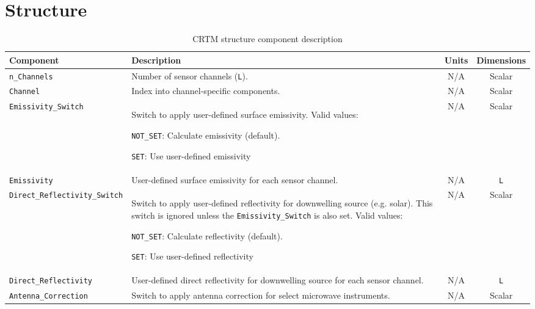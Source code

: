 \clearpage
\section{\Options{} Structure}
\label{sec:options_structure}



\begin{table}[htp]
  \centering
  \begin{tabular}{l p{7cm} c c}
    \hline
    \sffamily\textbf{Component} & \sffamily\textbf{Description} & \sffamily\textbf{Units} & \sffamily\textbf{Dimensions} \\
    \hline\hline
    \texttt{n\_Channels}                  & Number of sensor channels (\texttt{L}). & N/A & Scalar \\
    \texttt{Channel}                      & Index into channel-specific components. & N/A & Scalar \\
    \texttt{Emissivity\_Switch}           & Switch to apply user-defined surface emissivity. Valid values:

    \parbox{7cm}{\hspace{0.5cm}\texttt{NOT\_SET}: Calculate emissivity (default).
    
                 \hspace{0.5cm}\texttt{SET}: Use user-defined emissivity}
     & N/A & Scalar \\
    \texttt{Emissivity}                   & User-defined surface emissivity for each sensor channel. & N/A & \texttt{L} \\
    \texttt{Direct\_Reflectivity\_Switch} & Switch to apply user-defined reflectivity for downwelling source (e.g. solar). This switch is ignored unless the \texttt{Emissivity\_Switch} is also set. Valid values:

    \parbox{7cm}{\hspace{0.5cm}\texttt{NOT\_SET}: Calculate reflectivity (default).
    
                 \hspace{0.5cm}\texttt{SET}: Use user-defined reflectivity}
     & N/A & Scalar \\
    \texttt{Direct\_Reflectivity}         & User-defined direct reflectivity for downwelling source for each sensor channel. & N/A & \texttt{L} \\
    \texttt{Antenna\_Correction}          & Switch to apply antenna correction for select microwave instruments. & N/A & Scalar \\
    \hline
  \end{tabular}
  \caption{CRTM \Options{} structure component description}
  \label{tab:options_structure}
\end{table}

\clearpage






